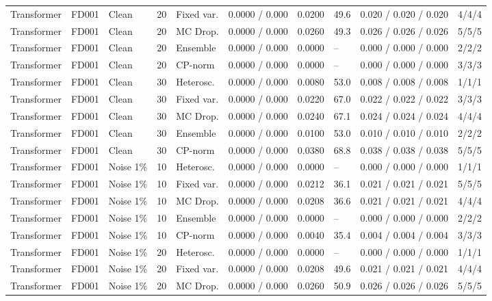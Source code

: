 \documentclass[10pt,a4paper]{article}
\begin{document}
\begin{landscape}
\begin{center}
\begin{longtable}{lllllcclll}
Transformer & FD001 & Clean & 20 & Fixed var. & 0.0000 / 0.000 & 0.0200 & 49.6 & 0.020 / 0.020 / 0.020 & 4/4/4 \\
Transformer & FD001 & Clean & 20 & MC Drop. & 0.0000 / 0.000 & 0.0260 & 49.3 & 0.026 / 0.026 / 0.026 & 5/5/5 \\
Transformer & FD001 & Clean & 20 & Ensemble & 0.0000 / 0.000 & 0.0000 & -- & 0.000 / 0.000 / 0.000 & 2/2/2 \\
Transformer & FD001 & Clean & 20 & CP-norm & 0.0000 / 0.000 & 0.0000 & -- & 0.000 / 0.000 / 0.000 & 3/3/3 \\
Transformer & FD001 & Clean & 30 & Heterosc. & 0.0000 / 0.000 & 0.0080 & 53.0 & 0.008 / 0.008 / 0.008 & 1/1/1 \\
Transformer & FD001 & Clean & 30 & Fixed var. & 0.0000 / 0.000 & 0.0220 & 67.0 & 0.022 / 0.022 / 0.022 & 3/3/3 \\
Transformer & FD001 & Clean & 30 & MC Drop. & 0.0000 / 0.000 & 0.0240 & 67.1 & 0.024 / 0.024 / 0.024 & 4/4/4 \\
Transformer & FD001 & Clean & 30 & Ensemble & 0.0000 / 0.000 & 0.0100 & 53.0 & 0.010 / 0.010 / 0.010 & 2/2/2 \\
Transformer & FD001 & Clean & 30 & CP-norm & 0.0000 / 0.000 & 0.0380 & 68.8 & 0.038 / 0.038 / 0.038 & 5/5/5 \\
Transformer & FD001 & Noise 1\% & 10 & Heterosc. & 0.0000 / 0.000 & 0.0000 & -- & 0.000 / 0.000 / 0.000 & 1/1/1 \\
Transformer & FD001 & Noise 1\% & 10 & Fixed var. & 0.0000 / 0.000 & 0.0212 & 36.1 & 0.021 / 0.021 / 0.021 & 5/5/5 \\
Transformer & FD001 & Noise 1\% & 10 & MC Drop. & 0.0000 / 0.000 & 0.0208 & 36.6 & 0.021 / 0.021 / 0.021 & 4/4/4 \\
Transformer & FD001 & Noise 1\% & 10 & Ensemble & 0.0000 / 0.000 & 0.0000 & -- & 0.000 / 0.000 / 0.000 & 2/2/2 \\
Transformer & FD001 & Noise 1\% & 10 & CP-norm & 0.0000 / 0.000 & 0.0040 & 35.4 & 0.004 / 0.004 / 0.004 & 3/3/3 \\
Transformer & FD001 & Noise 1\% & 20 & Heterosc. & 0.0000 / 0.000 & 0.0000 & -- & 0.000 / 0.000 / 0.000 & 1/1/1 \\
Transformer & FD001 & Noise 1\% & 20 & Fixed var. & 0.0000 / 0.000 & 0.0208 & 49.6 & 0.021 / 0.021 / 0.021 & 4/4/4 \\
Transformer & FD001 & Noise 1\% & 20 & MC Drop. & 0.0000 / 0.000 & 0.0260 & 50.9 & 0.026 / 0.026 / 0.026 & 5/5/5 \\

\end{longtable}
\end{center}
\end{landscape}
\end{document}
